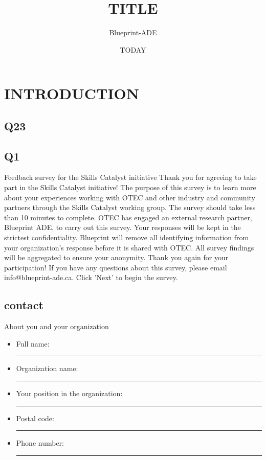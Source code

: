 \documentclass[]{article}
\title{TITLE}
\author{Blueprint-ADE}
\date{TODAY}
\newcommand{\Qline}[1]{\noindent\rule{#1}{0.6pt}}
\begin{document}
\maketitle

\section{INTRODUCTION}
\subsection{Q23}



\subsection{Q1}

Feedback survey for the Skills Catalyst initiative     Thank you for agreeing to take part in the Skills Catalyst initiative! The purpose of this survey is to learn more about your experiences working with OTEC and other industry and community partners through the Skills Catalyst working group. The survey should take less than 10 minutes to complete.       OTEC has engaged an external research partner, Blueprint ADE, to carry out this survey. Your responses will be kept in the strictest confidentiality. Blueprint will remove all identifying information from your organization’s response before it is shared with OTEC. All survey findings will be aggregated to ensure your anonymity.     Thank you again for your participation! If you have any questions about this survey, please email info@blueprint-ade.ca.    Click 'Next' to begin the survey.





\subsection{contact}

About you and your organization

\begin{itemize}
\item[\ding{47}] Full name:\Qline{5cm}
\item[\ding{47}] Organization name:\Qline{5cm}
\item[\ding{47}] Your position in the organization:\Qline{5cm}
\item[\ding{47}] Postal code:\Qline{5cm}
\item[\ding{47}] Phone number:\Qline{5cm}
\end{itemize}
\end{document}
